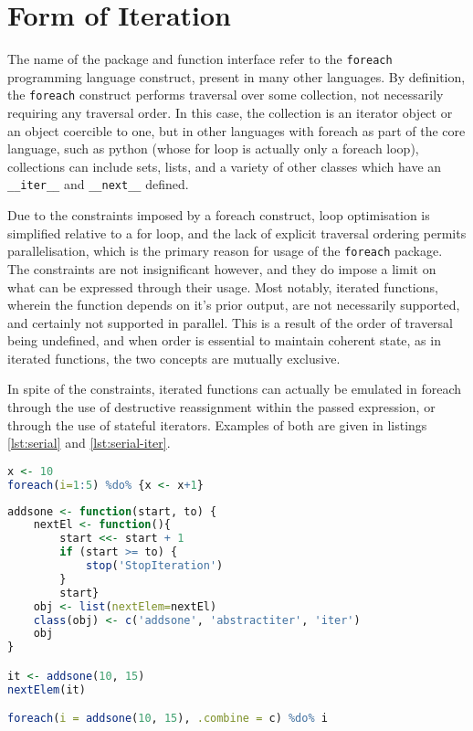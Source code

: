 \documentclass[a4paper,10pt]{article}
\begin{document}
\section{Form of Iteration}\label{sec:form-iter}

The name of the package and function interface refer to the \texttt{foreach}
programming language construct, present in many other languages.
By definition, the \texttt{foreach} construct performs traversal over some
collection, not necessarily requiring any traversal order.
In this case, the collection is an iterator object or an object coercible to
one, but in other languages with foreach as part of the core language, such as
python (whose for loop is actually only a foreach loop), collections can
include sets, lists, and a variety of other classes which have an
\texttt{\_\_iter\_\_} and \texttt{\_\_next\_\_} defined\cite{python2020iter}.

Due to the constraints imposed by a foreach construct, loop optimisation is
simplified relative to a for loop, and the lack of explicit traversal ordering
permits parallelisation, which is the primary reason for usage of the
\texttt{foreach} package.
The constraints are not insignificant however, and they do impose a limit on
what can be expressed through their usage.
Most notably, iterated functions, wherein the function depends on it's prior
output, are not necessarily supported, and certainly not supported in parallel.
This is a result of the order of traversal being undefined, and when order is
essential to maintain coherent state, as in iterated functions, the two
concepts are mutually exclusive.

In spite of the constraints, iterated functions can actually be emulated in
foreach through the use of destructive reassignment within the passed
expression, or through the use of stateful iterators.
Examples of both are given in listings \ref{lst:serial} and \ref{lst:serial-iter}.

\begin{lstlisting}[language=R,caption={Serial iterated function through destructive reassignment},label=lst:serial]
x <- 10
foreach(i=1:5) %do% {x <- x+1}
\end{lstlisting}

\begin{lstlisting}[language=R,caption={Serial iterated function through creation of a stateful iterator},label=lst:serial-iter]
addsone <- function(start, to) {
	nextEl <- function(){
		start <<- start + 1
		if (start >= to) {
			stop('StopIteration')
		}
		start}
	obj <- list(nextElem=nextEl)
	class(obj) <- c('addsone', 'abstractiter', 'iter')
	obj
}

it <- addsone(10, 15)
nextElem(it)

foreach(i = addsone(10, 15), .combine = c) %do% i
\end{lstlisting}
\end{document}
